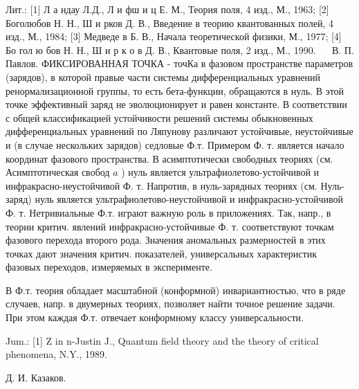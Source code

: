 \documentclass[10pt]{article}
\begin{document}
Лит.: [1] Л а ндау Л.Д., Л и фш и ц Е. М., Теория поля, 4 изд., М., 1963; [2] Боголюбов Н. Н., Ш и рков Д. В., Введение в теорию квантованных полей, 4 изд., М., 1984; [3] Медведе в Б. В., Начала теоретической физики, М., 1977; [4] Бо гол ю бов Н. Н., Ш и р к о в Д. В., Квантовые поля, 2 изд., М., 1990. $\quad$ В. П. Павлов. ФИКСИРОВАННАЯ ТОЧКА - точКа в фазовом пространстве параметров (зарядов), в которой правые части системы дифференциальных уравнений ренормализационной группы, то есть бета-функции, обращаются в нуль. В этой точке эффективный заряд не эволюционирует и равен константе. В соответствии с общей классификацией устойчивости решений системы обыкновенных дифференциальных уравнений по Ляпунову различают устойчивые, неустойчивые и (в случае нескольких зарядов) седловые Ф.т. Примером Ф. т. является начало координат фазового пространства. В асимптотически свободных теориях (см. Асимптотическая свобод $a$ ) нуль является ультрафиолетово-устойчивой и инфракрасно-неустойчивой Ф. т. Напротив, в нуль-зарядных теориях (см. Нуль-заряд) нуль является ультрафиолетово-неустойчивой и инфракрасно-устойчивой Ф. т. Нетривиальные Ф.т. играют важную роль в приложениях. Так, напр., в теории критич. явлений инфракрасно-устойчивые Ф. т. соответствуют точкам фазового перехода второго рода. Значения аномальных размерностей в этих точках дают значения критич. показателей, универсальных характеристик фазовых переходов, измеряемых в эксперименте.



В Ф.т. теория обладает масштабной (конформной) инвариантностью, что в ряде случаев, напр. в двумерных теориях, позволяет найти точное решение задачи. При этом каждая Ф.т. отвечает конформному классу универсальности.



Jum.: [1] Z in n-Justin J., Quantum field theory and the theory of critical phenomena, N.Y., 1989.



Д. И. Казаков.
\end{document}
